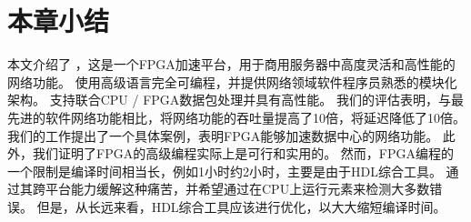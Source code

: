 \section{本章小结}
\label{clicknp:sec:conclusion}

本文介绍了 \name ，这是一个FPGA加速平台，用于商用服务器中高度灵活和高性能的网络功能。
\name 使用高级语言完全可编程，并提供网络领域软件程序员熟悉的模块化架构。
\name 支持联合CPU / FPGA数据包处理并具有高性能。
我们的评估表明，与最先进的软件网络功能相比，\name 将网络功能的吞吐量提高了10倍，将延迟降低了10倍。
我们的工作提出了一个具体案例，表明FPGA能够加速数据中心的网络功能。
此外，我们证明了FPGA的高级编程实际上是可行和实用的。
然而，FPGA编程的一个限制是编译时间相当长，例如1小时约2小时，主要是由于HDL综合工具。
\name 通过其跨平台能力缓解这种痛苦，并希望通过在CPU上运行元素来检测大多数错误。
但是，从长远来看，HDL综合工具应该进行优化，以大大缩短编译时间。





